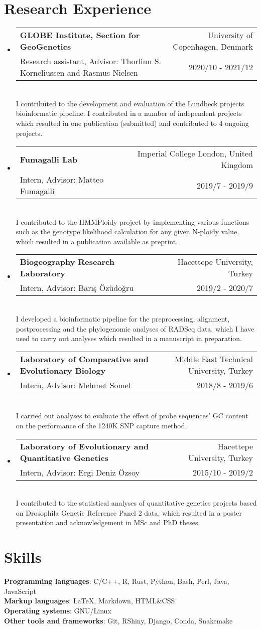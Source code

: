 \documentclass[letterpaper,10.5pt]{article}
\makeatletter
\newcommand{\resumeSubheading}[5]{
  \vspace{-1pt}\item
    \begin{tabular*}{0.97\textwidth}{l@{\extracolsep{\fill}}r}
      \textbf{#1} & #2 \\
      {\small#3} & {\small #4} \\
    \end{tabular*}\vspace{3pt} \\
    #5
}
\newcommand{\resumeSubHeadingListStart}{\begin{itemize}[leftmargin=*]}
\newcommand{\resumeSubHeadingListEnd}{\end{itemize}}
\makeatother
\begin{document}
\section{Research Experience}
  \resumeSubHeadingListStart

    \resumeSubheading
      {GLOBE Institute, Section for GeoGenetics}{University of Copenhagen, Denmark}
      {Research assistant, Advisor: Thorfinn S. Korneliussen and Rasmus Nielsen}{2020/10 - 2021/12}
      {I contributed to the development and evaluation of the Lundbeck projects bioinformatic pipeline. I contributed in a number of independent projects which resulted in one publication (submitted) and contributed to 4 ongoing projects.}
    \medskip
    
    
    \resumeSubheading
      {Fumagalli Lab}{Imperial College London, United Kingdom}
      {Intern, Advisor: Matteo Fumagalli}{2019/7 - 2019/9}
      {I contributed to the HMMPloidy project by implementing various functions such as the genotype likelihood calculation for any given N-ploidy value, which resulted in a publication available as preprint.}
    \medskip


    \resumeSubheading
      {Biogeography Research Laboratory}{Hacettepe University, Turkey}
      {Intern, Advisor: Bar{\i}\c{s} \"{O}z\"{u}do\u{g}ru}{2019/2 - 2020/7}
      {I developed a bioinformatic pipeline for the preprocessing, alignment, postprocessing and the phylogenomic analyses of RADSeq data, which I have used to carry out analyses which resulted in a manuscript in preparation.}
    \medskip
 
    \resumeSubheading
      {Laboratory of Comparative and Evolutionary Biology}{Middle East Technical University, Turkey}
      {Intern, Advisor: Mehmet Somel}{2018/8 - 2019/6}
      {I carried out analyses to evaluate the effect of probe sequences' GC content on the performance of the 1240K SNP capture method.}

    \medskip


    \resumeSubheading
      {Laboratory of Evolutionary and Quantitative Genetics}{Hacettepe University, Turkey}
      {Intern, Advisor: Ergi Deniz \"{O}zsoy}{2015/10 - 2019/2}
      {I contributed to the statistical analyses of quantitative genetics projects based on Drosophila Genetic Reference Panel 2 data, which resulted in a poster presentation and acknowledgement in MSc and PhD theses.}
  \resumeSubHeadingListEnd
  


\section{Skills}
\textbf{Programming languages}: C/C++, R, Rust, Python, Bash, Perl, Java, JavaScript \\
\textbf{Markup languages}: \LaTeX, Markdown, HTML\&CSS \\
\textbf{Operating systems}: GNU/Linux \\
\textbf{Other tools and frameworks}: Git, RShiny, Django, Conda, Snakemake \\
\end{document}
